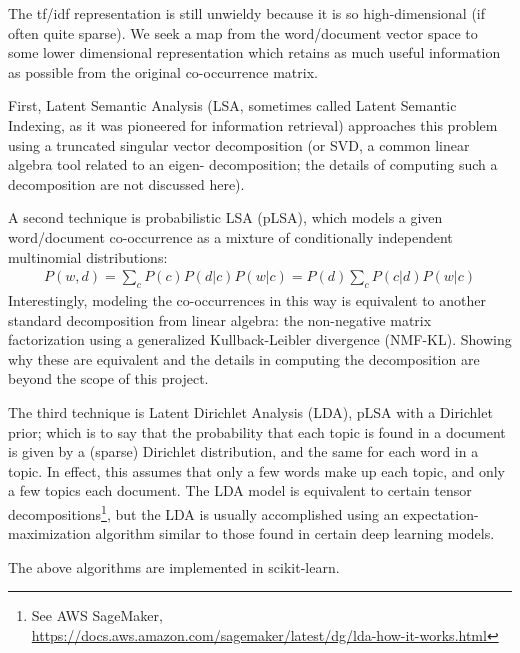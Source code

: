 \documentclass[]{article}
\begin{document}
The tf/idf representation is still unwieldy because it is so high-dimensional (if often quite sparse). We seek a map from the word/document vector space to some lower dimensional representation which retains as much useful information as possible from the original co-occurrence matrix. 

First, Latent Semantic Analysis (LSA, sometimes called Latent Semantic Indexing, as it was pioneered for information retrieval)\cite{Feldman-textmining} approaches this problem using a truncated singular vector decomposition (or SVD, a common linear algebra tool related to an eigen- decomposition; the details of computing such a decomposition are not discussed here).

A second technique is probabilistic LSA (pLSA)\cite{Feldman-textmining}, which models a given word/document co-occurrence as a mixture of conditionally independent multinomial distributions:
\begin{align}
	P(w,d)=\sum _{c}P(c)P(d|c)P(w|c)=P(d)\sum _{c}P(c|d)P(w|c) 
\end{align}
Interestingly, modeling the co-occurrences in this way is equivalent to another standard decomposition from linear algebra: the non-negative matrix factorization using a generalized Kullback-Leibler divergence (NMF-KL). Showing why these are equivalent and the details in computing the decomposition are beyond the scope of this project.

The third technique is Latent Dirichlet Analysis (LDA)\cite{Blei2003}, pLSA with a Dirichlet prior; which is to say that the probability that each topic is found in a document is given by a (sparse) Dirichlet distribution, and the same for each word in a topic. In effect, this assumes that only a few words make up each topic, and only a few topics each document. The LDA model is equivalent to certain tensor decompositions\footnote{See AWS SageMaker, \url{https://docs.aws.amazon.com/sagemaker/latest/dg/lda-how-it-works.html}}, but the LDA is usually accomplished using an expectation-maximization algorithm similar to those found in certain deep learning models.

The above algorithms are implemented in scikit-learn\cite{scikit-learn}.
\end{document}

